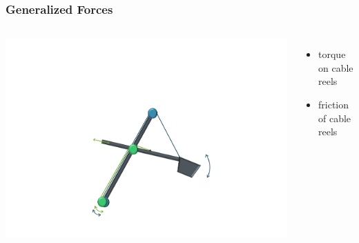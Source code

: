 \begin{frame}
	\frametitle{Generalized Forces}
	\begin{columns}
		\centering
		\includegraphics[trim=30cm 5cm 30cm 23cm, clip=true, width=\linewidth]{img/Excavator_Only}
		\begin{itemize}
			\item{torque on cable reels}
			\item{friction of cable reels}
		\end{itemize}
	\end{columns}
\end{frame}

%
%

